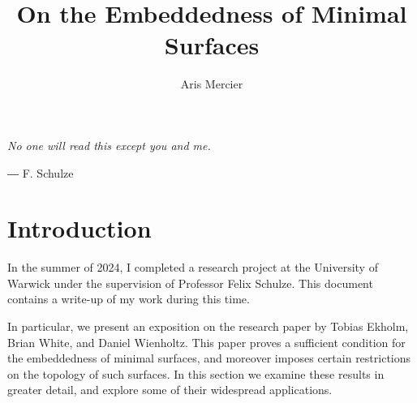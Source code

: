 \documentclass[a4paper, 11pt]{article}
\title{On the Embeddedness of Minimal Surfaces}
\author{Aris Mercier}
\date{}
\theoremstyle{plain}
\theoremstyle{definition}
\theoremstyle{remark}
\numberwithin{equation}{subsection}
\begin{document}
\maketitle

\epigraph{\emph{No one will read this except you and me.}}{― F. Schulze}
\section{Introduction}

\begin{comment}
In the summer of 2024, I completed a research project at the University of Warwick under the supervision of Professor Felix Schulze. This document contains a write-up of my work during this time.


\cref{Preliminaries} is a brief summary of my background reading in preparation for this project. My main reference has been Leon Simon's \emph{Introduction to Geometric Measure Theory} \cite{Sim18}, which is an updated version of his classic text \emph{Lectures on Geometric Measure Theory}. Parts of this section have also been inspired by \cite{Rin22} and \cite{Mor16}. In an effort to keep this section short, many proofs have been omitted. Instead, citations have been provided throughout, and interested readers are encouraged to consult them for further details.

\cref{Paper} presents an exposition on the research paper \cite{EWW02} by Tobias Ekholm, Brian White, and Daniel Wienholtz. This paper proves a sufficient condition for the embeddedness of minimal surfaces, and moreover imposes certain restrictions on the topology of such surfaces. In this section we examine these results in greater detail, and explore some of their widespread applications.

The work presented in this document is entirely expository. In particular, I claim absolutely no originality over its contents. I would like to thank all those who inspired and helped me along the way, for the quality of this work would be much poorer without them.
\end{comment}

In the summer of 2024, I completed a research project at the University of Warwick under the supervision of Professor Felix Schulze. This document contains a write-up of my work during this time.

In particular, we present an exposition on the research paper \cite{EWW02} by Tobias Ekholm, Brian White, and Daniel Wienholtz. This paper proves a sufficient condition for the embeddedness of minimal surfaces, and moreover imposes certain restrictions on the topology of such surfaces. In this section we examine these results in greater detail, and explore some of their widespread applications.
\end{document}
